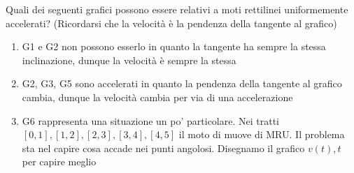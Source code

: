 \vskip3mm
\begin{minipage}[t]{0.48\textwidth}
\end{minipage}
%
\begin{minipage}[t]{0.48\textwidth}
\end{minipage}
\vskip3mm
Quali dei seguenti grafici possono essere relativi a moti rettilinei uniformemente accelerati?  (Ricordarsi che la velocità è la pendenza della tangente al grafico)
\begin{enumerate}
	\item G1 e G2 non possono esserlo in quanto la tangente ha sempre la stessa inclinazione, dunque la velocità è sempre la stessa
	\item G2, G3, G5 sono accelerati in quanto la pendenza della tangente al grafico cambia, dunque la velocità cambia per via di una accelerazione
	\item G6 rappresenta una situazione un po' particolare. Nei tratti $ \left[0,1\right], \left[1,2\right], \left[2,3\right],\left[3,4\right], \left[4,5\right] $ il moto di muove di MRU. Il problema sta nel capire cosa accade nei punti angolosi. Disegnamo il grafico $ v\left(t\right), t $ per capire meglio
\end{enumerate}
\vskip3mm
